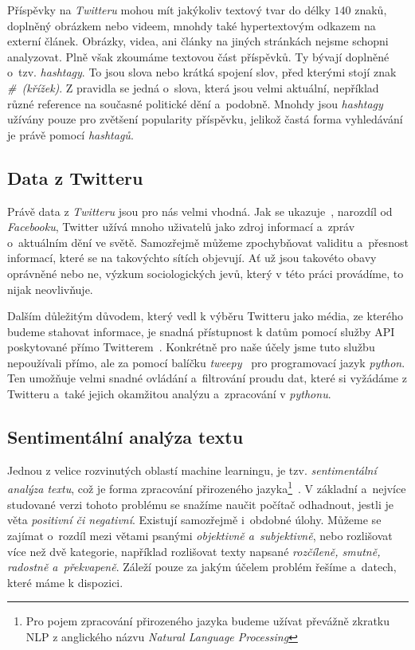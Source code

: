\documentclass[12pt, a4paper]{article}
\numberwithin{equation}{section} 	%
\begin{document}
Příspěvky na \textit{Twitteru} mohou mít jakýkoliv textový tvar do délky $140$ znaků, doplněný obrázkem nebo videem, mnohdy také hypertextovým odkazem na externí článek. Obrázky, videa, ani články na jiných stránkách nejsme schopni analyzovat. Plně však zkoumáme textovou část příspěvků. Ty bývají doplněné o~tzv. \textit{hashtagy}. To jsou slova nebo krátká spojení slov, před kterými stojí znak \textit{\#~(křížek)}. Z pravidla se jedná o~slova, která jsou velmi aktuální, nepříklad různé reference na současné politické dění a~podobně. Mnohdy jsou \textit{hashtagy} užívány pouze pro zvětšení popularity příspěvku, jelikož častá forma vyhledávání je právě pomocí \textit{hashtagů}.

\subsection{Data z Twitteru}
\noindent Právě data z \textit{Twitteru} jsou pro nás velmi vhodná. Jak se ukazuje~\cite{whyNotFb}, narozdíl od \textit{Facebooku}, Twitter užívá mnoho uživatelů jako zdroj informací a~zpráv o~ak\-tu\-ál\-ním dění ve světě. Samozřejmě můžeme zpochybňovat validitu a~přesnost informací, které se na takovýchto sítích objevují. Ať už jsou takovéto obavy oprávněné nebo ne, výzkum sociologických jevů, který v této práci provádíme, to nijak neovlivňuje.

Dalším důležitým důvodem, který vedl k výběru Twitteru jako média, ze kterého budeme stahovat informace, je snadná přístupnost k datům pomocí služby API poskytované přímo Twitterem~\cite{twitterAPI}. Konkrétně pro naše účely jsme tuto službu nepoužívali přímo, ale za pomocí balíčku \textit{tweepy}~\cite{tweepy} pro programovací jazyk \textit{python}. Ten umožňuje velmi snadné ovládání a~filtrování proudu dat, které si vyžádáme z Twitteru a~také jejich okamžitou analýzu a~zpracování v \textit{pythonu}.

\subsection{Sentimentální analýza textu}
\noindent Jednou z velice rozvinutých oblastí machine learningu, je tzv. \textit{sentimentální a\-na\-lý\-za textu}, což je forma zpracování přirozeného jazyka\footnote{Pro pojem zpracování přirozeného jazyka budeme užívat převážně zkratku NLP z anglického názvu \textit{Natural Language Processing}}~\cite{NLTKbook}. V základní a~nejvíce studované verzi tohoto problému se snažíme naučit počítač odhadnout, jestli je věta \textit{positivní či negativní}. Existují samozřejmě i~obdobné úlohy. Můžeme se zajímat o~rozdíl mezi větami psanými \textit{objektivně a~subjektivně}, nebo rozlišovat více než dvě kategorie, například rozlišovat texty napsané \textit{rozčíleně, smutně, radostně a~překvapeně}. Záleží pouze za jakým účelem problém řešíme a~datech, které máme k dispozici.
\end{document}
